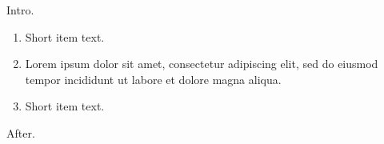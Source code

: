 \documentclass[10pt]{article}
\begin{document}
Intro.
\begin{enumerate}[label=(\alph*)]
\item Short item text.
\item Lorem ipsum dolor sit amet, consectetur adipiscing elit, sed do eiusmod tempor incididunt ut labore et dolore magna aliqua.
\item Short item text.
\end{enumerate}
After.
\end{document}
